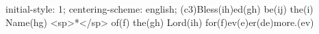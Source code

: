 initial-style: 1;
centering-scheme: english;
(c3)Bless(ih)ed(gh) be(ij) the(i) Name(hg) <sp>*</sp> of(f) the(gh) Lord(ih) for(f)ev(e)er(de)more.(ev)